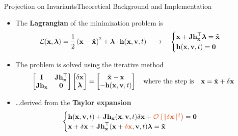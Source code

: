 \begin{frame}{Projection on Invariants}{Theoretical Background and Implementation}
  \begin{itemize}
    \item The \textbf{Lagrangian} of the minimization problem is
    \begin{equation*}
      \mathcal{L}(\mathbf{x}, \boldsymbol{\lambda}) = \frac{1}{2}\left(\mathbf{x} - \tilde{\mathbf{x}}\right)^2 + \boldsymbol{\lambda} \cdot \mathbf{h}(\mathbf{x}, \mathbf{v}, t)
      \quad \rightarrow \quad
      \begin{cases}
        \mathbf{x} + \mathbf{Jh}_{\mathbf{x}}^\top \boldsymbol{\lambda} = \tilde{\mathbf{x}} \\
        \mathbf{h}(\mathbf{x}, \mathbf{v}, t) = \mathbf{0}
      \end{cases}
    \end{equation*}
    \item The problem is solved using the iterative method
    \begin{equation*}
      \begin{bmatrix}
        \mathbf{I}        & \mathbf{Jh}_{\mathbf{x}}^\top \\
        \mathbf{Jh}_{\mathbf{x}} & \mathbf{0}
      \end{bmatrix}
      \begin{bmatrix}
        \delta\mathbf{x} \\
        \boldsymbol{\lambda}
      \end{bmatrix} = \begin{bmatrix}
        \tilde{\mathbf{x}} - \mathbf{x} \\
        -\mathbf{h}(\mathbf{x}, \mathbf{v}, t)
      \end{bmatrix} \quad \text{where the step is} \quad \mathbf{x} = \tilde{\mathbf{x}} + \delta\mathbf{x}
    \end{equation*}
    \item[] \dots derived from the \textbf{Taylor expansion}
    \begin{equation*}
      \begin{cases}
        \mhv + \m{Jh}_{\mx}(\mx, \m{v}, t) \delta\mx + \textcolor{mycolor2}{\mathcal{O}\left(\| \delta\mx \|^2\right)} = \m{0} \\
        \mx + \delta\mx + \m{Jh}_{\mx}^{\top}(\mx + \textcolor{mycolor2}{\delta \mx}, \m{v}, t) \boldsymbol{\lambda} = \tilde{\mx}
      \end{cases}
    \end{equation*}
  \end{itemize}
\end{frame}

